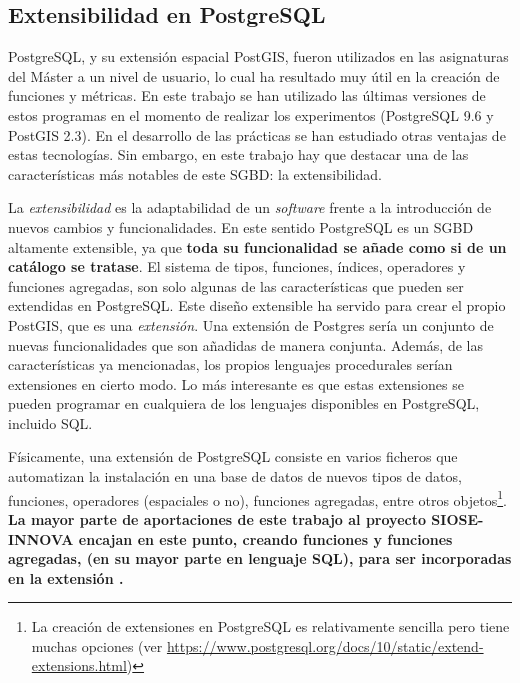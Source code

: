 \subsection{Extensibilidad en PostgreSQL}\label{subsec:exten}

PostgreSQL, y su extensión espacial PostGIS, fueron utilizados en las asignaturas del Máster a un nivel de usuario, lo cual ha resultado muy útil en la creación de funciones y métricas. En este trabajo se han utilizado las últimas versiones de estos programas en el momento de realizar los experimentos (PostgreSQL 9.6 y PostGIS 2.3). En el desarrollo de las prácticas se han estudiado otras ventajas de estas tecnologías. Sin embargo, en este trabajo hay que destacar una de las características más notables de este SGBD: la extensibilidad.

La \textit{extensibilidad} es la adaptabilidad de un \textit{software} frente a la introducción de nuevos cambios y funcionalidades. En este sentido PostgreSQL es un SGBD altamente extensible, ya que \textbf{toda su funcionalidad se añade como si de un catálogo se tratase}. El sistema de tipos, funciones, índices, operadores y funciones agregadas, son solo algunas de las características que pueden ser extendidas en PostgreSQL. Este diseño extensible ha servido para crear el propio PostGIS, que es una \textit{extensión}. Una extensión de Postgres sería un conjunto de nuevas funcionalidades que son añadidas de manera conjunta. Además, de las características ya mencionadas, los propios lenguajes procedurales serían extensiones en cierto modo. Lo más interesante es que estas extensiones se pueden programar en cualquiera de los lenguajes disponibles en PostgreSQL, incluido SQL.

Físicamente, una extensión de PostgreSQL consiste en varios ficheros que automatizan la instalación en una base de datos de nuevos tipos de datos, funciones, operadores (espaciales o no), funciones agregadas, entre otros objetos\footnote{La creación de extensiones en PostgreSQL es relativamente sencilla pero tiene muchas opciones (ver \href{https://www.postgresql.org/docs/10/static/extend-extensions.html}{https://www.postgresql.org/docs/10/static/extend-extensions.html})}. \textbf{La mayor parte de aportaciones de este trabajo al proyecto SIOSE-INNOVA encajan en este punto, creando funciones y funciones agregadas, (en su mayor parte en lenguaje SQL), para ser incorporadas en la extensión \pgland{}.}

